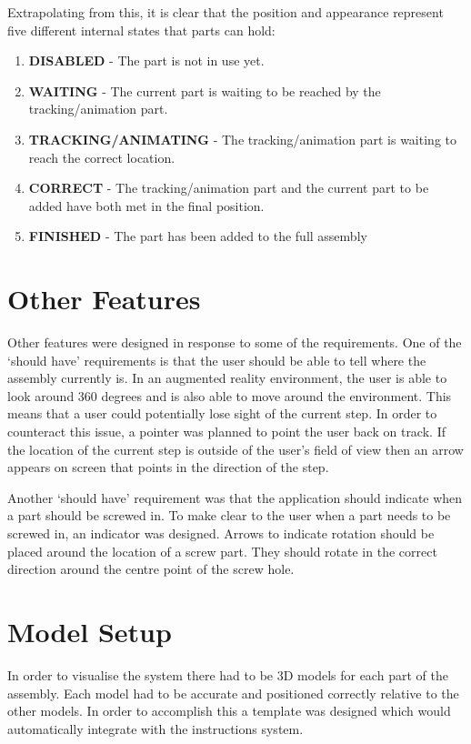 \documentclass{l4proj}
\begin{document}
Extrapolating from this, it is clear that the position and appearance represent five different internal states that parts can hold:

\begin{enumerate}
    \item \textbf{DISABLED} - The part is not in use yet.
    \item \textbf{WAITING} - The current part is waiting to be reached by the tracking/animation part.
    \item \textbf{TRACKING/ANIMATING} - The tracking/animation part is waiting to reach the correct location.
    \item \textbf{CORRECT} - The tracking/animation part and the current part to be added have both met in the final position.
    \item \textbf{FINISHED} - The part has been added to the full assembly
\end{enumerate}

\section{Other Features}

Other features were designed in response to some of the requirements. One of the `should have' requirements is that the user should be able to tell where the assembly currently is. In an augmented reality environment, the user is able to look around 360 degrees and is also able to move around the environment. This means that a user could potentially lose sight of the current step. In order to counteract this issue, a pointer was planned to point the user back on track. If the location of the current step is outside of the user's field of view then an arrow appears on screen that points in the direction of the step.

Another `should have' requirement was that the application should indicate when a part should be screwed in. To make clear to the user when a part needs to be screwed in, an indicator was designed. Arrows to indicate rotation should be placed around the location of a screw part. They should rotate in the correct direction around the centre point of the screw hole.

\section{Model Setup} \label{modelSetup}

In order to visualise the system there had to be 3D models for each part of the assembly. Each model had to be accurate and positioned correctly relative to the other models. In order to accomplish this a template was designed which would automatically integrate with the instructions system. 
\end{document}
